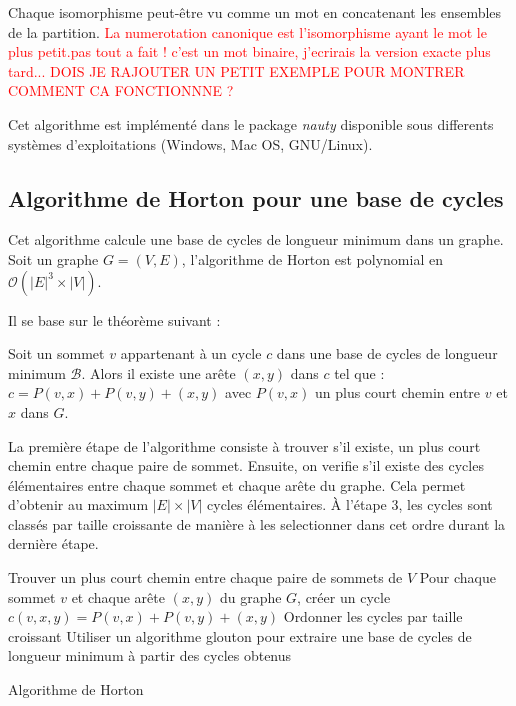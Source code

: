 Chaque isomorphisme peut-être vu comme un mot en concatenant les ensembles de la partition.
\textcolor{red}{La numerotation canonique est l'isomorphisme ayant le mot le plus petit.pas tout a fait ! c'est un mot binaire, j'ecrirais la version exacte plus tard... DOIS JE RAJOUTER UN PETIT EXEMPLE POUR MONTRER COMMENT CA FONCTIONNNE ? } 

Cet algorithme est implémenté dans le package \textit{nauty}\cite{McKay201494} disponible sous differents systèmes d'exploitations (Windows, Mac OS, GNU/Linux).


\subsection{Algorithme de Horton pour une base de cycles}

Cet algorithme calcule une base de cycles de longueur minimum dans un graphe. Soit un graphe $G = (V,E)$, l'algorithme de Horton\cite{horton} est polynomial en $\mathcal{O} (|E|^3\times |V|)$.


Il se base sur le théorème suivant : 

\begin{theorem}
Soit un sommet $v$ appartenant à un cycle $c$ dans une base de cycles de longueur minimum $\mathcal{B}$. Alors il existe une arête $(x,y)$ dans $c$ tel que : $c = P(v,x) + P(v,y) + (x,y)$ avec $P(v,x)$ un plus court chemin entre $v$ et $x$ dans $G$.
\end{theorem}

La première étape de l'algorithme consiste à trouver s'il existe, un plus court chemin entre chaque paire de sommet. Ensuite, on verifie s'il existe des cycles élémentaires entre chaque sommet et chaque arête du graphe. Cela permet d'obtenir au maximum $|E| \times |V|$ cycles élémentaires. À l'étape $3$, les cycles sont classés par taille croissante de manière à les selectionner dans cet ordre durant la dernière étape.

\vspace{0.5cm}
\begin{algorithm}[H]
\SetAlgoLined
{}
Trouver un plus court chemin entre chaque paire de sommets de $V$ \;
Pour chaque sommet $v$ et chaque arête $(x,y)$ du graphe $G$, créer un cycle $c(v,x,y) = P(v,x) + P(v,y) + (x,y)$\;
Ordonner les cycles par taille croissant\;
Utiliser un algorithme glouton pour extraire une base de cycles de longueur minimum à partir des cycles obtenus\;
\caption{Algorithme de Horton}
\end{algorithm} 

